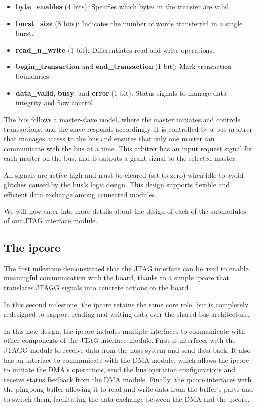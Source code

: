 \documentclass[a4paper,11pt,oneside]{report}
\begin{document}
\begin{itemize}
    \item \textbf{byte\_enables} (4 bits): Specifies which bytes in the transfer are valid.
    \item \textbf{burst\_size} (8 bits): Indicates the number of words transferred in a single burst.
    \item \textbf{read\_n\_write} (1 bit): Differentiates read and write operations.
    \item \textbf{begin\_transaction} and \textbf{end\_transaction} (1 bit): Mark transaction boundaries.
    \item \textbf{data\_valid}, \textbf{busy}, and \textbf{error} (1 bit): Status signals to manage data integrity and flow control.
\end{itemize}

The bus follows a master-slave model, where the master initiates and controls transactions, and the slave responds accordingly. It is
controlled by a bus arbitrer that manages access to the bus and ensures that only one master can communicate with the bus at a time.
This arbitrer has an input request signal for each master on the bus, and it outputs a grant signal to the selected master.

All signals are active-high and must be cleared (set to zero) when idle to avoid glitches caused by the bus’s logic design. 
This design supports flexible and efficient data exchange among connected modules.

We will now enter into more details about the design of each of the submodules of our JTAG interface module.

\subsection{The ipcore}

The first milestone demonstrated that the JTAG interface can be used to enable meaningful communication with the board, thanks to a simple ipcore that translates JTAGG signals into concrete actions on the board.

In this second milestone, the ipcore retains the same core role, but is completely redesigned to support reading and writing data over the shared bus architecture.

In this new design, the ipcore includes multiple interfaces to communicate with other components of the JTAG interface module.  
First it interfaces with the JTAGG module to receive data from the host system and send data back.
It also has an interface to communicate with the DMA module, which allows the ipcore to initiate the DMA's operations, send the bus operation configurations and 
receive status feedback from the DMA module.
Finally, the ipcore interfaces with the pingpong buffer allowing it to read and write data from the buffer's parts and to switch them, facilitating the data exchange between the DMA and the ipcore.
\end{document}
